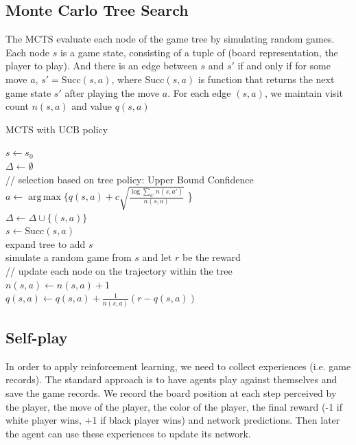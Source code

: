 \documentclass{article}
\DeclareMathOperator*{\argmax}{arg\,max}
\begin{document}
\subsection{Monte Carlo Tree Search}
The MCTS evaluate each node of the game tree by simulating random games. Each node $s$ is a game state, consisting of a tuple of (board representation, the player to play). And there is an edge between $s$ and $s'$ if and only if for some move $a$, $s' = \text{Succ}(s, a)$, where $\text{Succ}(s,a)$ is function that returns the next game state $s'$ after playing the move $a$. For each edge $(s, a)$, we maintain visit count $n(s,a)$ and value $q(s,a)$
\begin{algorithm} 
  \DontPrintSemicolon
  \caption{MCTS with UCB policy}
   {
    $ s \gets s_0 $ \\
    $ \Delta \gets \emptyset$ \\
    // selection based on tree policy: Upper Bound Confidence \\
     {
      $a  \gets \argmax \{ q(s, a) + c \sqrt{\frac{\log \sum_{a'}n(s, a')}{n(s,a)}}$ \}\\
      $\Delta \gets \Delta \cup \{(s, a)\}  $ \\
      $s \gets \text{Succ}(s, a) $\\
    }
    expand tree to add $s$ \\
    simulate a random game from $s$ and let $r$ be the reward \\
    // update each node on the trajectory within the tree \\
     {
      $ n(s, a) \gets n(s,a) + 1 $ \\
      $ q(s, a) \gets q(s,a) +  \frac{1}{n(s,a)} (r - q(s,a))$ \\
    }
  }
\end{algorithm}

\subsection{Self-play}
In order to apply reinforcement learning, we need to collect experiences (i.e. game records). The standard approach is to have agents play against themselves and save the game records. We record the board position at each step perceived by the player, the move of the player, the color of the player, the final reward (-1 if white player wins, +1 if black player wins) and network predictions. Then later the agent can use these experiences to update its network.
\end{document}
